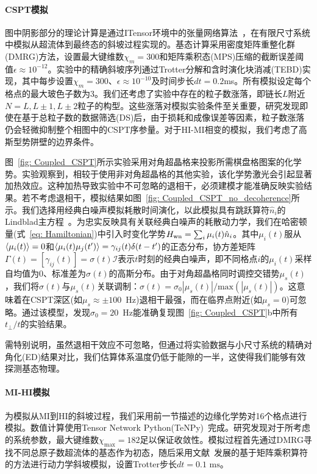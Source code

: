 \documentclass[preprint,superscriptaddress,floatfix, nofootinbib]{revtex4-2}
\begin{document}
\paragraph*{CSPT模拟} 图中阴影部分的理论计算是通过ITensor环境中的张量网络算法~\cite{itensor}，在有限尺寸系统中模拟从超流体到最终态的斜坡过程实现的。基态计算采用密度矩阵重整化群(DMRG)方法，设置最大键维数$\chi_m=300$和矩阵乘积态(MPS)压缩的截断误差阈值$\epsilon \approx 10^{-12}$。实验中的精确斜坡序列通过Trotter分解和含时演化块消减(TEBD)实现，其中每步设置$\chi_m=300$、$\epsilon \approx 10^{-10}$及时间步长$dt=0.2$ms。所有模拟设定每个格点的最大玻色子数为3。我们还考虑了实验中存在的粒子数涨落，即链长$L$附近$N=L, L\pm1, L\pm2$粒子的构型。这些涨落对模拟实验条件至关重要，研究发现即使在基于总粒子数的数据筛选(DS)后，由于损耗和成像误差等因素，粒子数涨落仍会轻微抑制整个相图中的CSPT序参量。对于HI-MI相变的模拟，我们考虑了高斯型势阱壁的边界条件。

图~\ref{fig: Coupled_CSPT}所示实验采用对角超晶格来投影所需棋盘格图案的化学势。实验观察到，相较于使用非对角超晶格的其他实验，该化学势激光会引起显著加热效应。这种加热导致实验中不可忽略的退相干，必须建模才能准确反映实验结果。若不考虑退相干，模拟结果如图~\ref{fig: Coupled_CSPT_no_decoherence}所示。我们选择用经典白噪声模拟耗散时间演化，以此模拟具有跳跃算符$\hat n_i$的Lindblad主方程~\cite{Kampen1992, Seif2022}。为忠实反映具有关联经典白噪声的耗散动力学，我们在哈密顿量(式~\eqref{eq: Hamiltonian})中引入时变化学势$H_{\rm wn}=\sum_i \mu_i(t) \hat  n_i$。其中$\mu_i(t)$服从$\braket{\mu_i(t)}=0$和$\braket{\mu_i(t)\mu_j(t')}=\gamma_{ij}(t) \delta(t-t')$的正态分布，协方差矩阵$\Gamma(t)=\left[\gamma_{ij}(t)\right]=\sigma(t)\mathcal{I}$表示$t$时刻的经典白噪声，即不同格点$i$的$\mu_i(t)$采样自均值为0、标准差为$\sigma(t)$的高斯分布。由于对角超晶格同时调控交错势$\mu_s(t)$，我们将$\sigma(t)$与$\mu_s(t)$关联调制：$\sigma(t)=\sigma_0 |\mu_s(t)|/\textrm{max}(|\mu_s(t)|)$。这意味着在CSPT深区(如$\mu_s \approx \pm 100$~Hz)退相干最强，而在临界点附近(如$\mu_s=0$)可忽略。通过该模型，发现$\sigma_0=20$~Hz能准确复现图~\ref{fig: Coupled_CSPT}b中所有$t_\perp/t$的实验结果。

需特别说明，虽然退相干效应不可忽略，但通过将实验数据与小尺寸系统的精确对角化(ED)结果对比，我们估算体系温度仍低于能隙的一半，这使得我们能够有效探测基态物理。

\paragraph*{MI-HI模拟} 为模拟从MI到HI的斜坡过程，我们采用前一节描述的边缘化学势对16个格点进行模拟。数值计算使用Tensor Network Python(TeNPy)~\cite{Hauschild18}完成。研究发现对于所考虑的系统参数，最大键维数$\chi_{\text{max}} = 182$足以保证收敛性。模拟过程首先通过DMRG寻找不同总原子数超流体的基态作为初态，随后采用文献~\cite{Zaletel2015}发展的基于矩阵乘积算符的方法进行动力学斜坡模拟，设置Trotter步长$dt = 0.1 \text{ ms}$。
\end{document}
